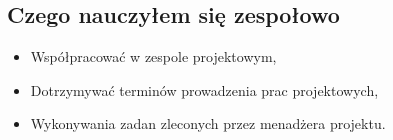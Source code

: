 \subsection{Czego nauczyłem się zespołowo}
\begin{itemize}
	\item Współpracować w zespole projektowym,
	\item Dotrzymywać terminów prowadzenia prac projektowych,
	\item Wykonywania zadan zleconych przez menadżera projektu.
\end{itemize} 